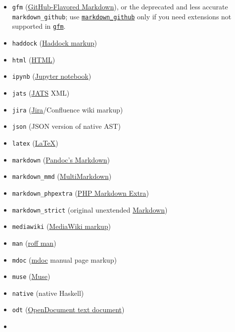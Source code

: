 \documentclass[
]{article}
\begin{document}
\begin{description}
\begin{itemize}
  e-book)
\item
  \texttt{gfm}
  (\href{https://help.github.com/articles/github-flavored-markdown/}{GitHub-Flavored
  Markdown}), or the deprecated and less accurate
  \texttt{markdown\_github}; use
  \protect\hyperlink{markdown-variants}{\texttt{markdown\_github}} only
  if you need extensions not supported in
  \protect\hyperlink{markdown-variants}{\texttt{gfm}}.
\item
  \texttt{haddock}
  (\href{https://www.haskell.org/haddock/doc/html/ch03s08.html}{Haddock
  markup})
\item
  \texttt{html} (\href{https://www.w3.org/html/}{HTML})
\item
  \texttt{ipynb}
  (\href{https://nbformat.readthedocs.io/en/latest/}{Jupyter notebook})
\item
  \texttt{jats} (\href{https://jats.nlm.nih.gov}{JATS} XML)
\item
  \texttt{jira}
  (\href{https://jira.atlassian.com/secure/WikiRendererHelpAction.jspa?section=all}{Jira}/Confluence
  wiki markup)
\item
  \texttt{json} (JSON version of native AST)
\item
  \texttt{latex} (\href{https://www.latex-project.org/}{LaTeX})
\item
  \texttt{markdown} (\protect\hyperlink{pandocs-markdown}{Pandoc's
  Markdown})
\item
  \texttt{markdown\_mmd}
  (\href{https://fletcherpenney.net/multimarkdown/}{MultiMarkdown})
\item
  \texttt{markdown\_phpextra}
  (\href{https://michelf.ca/projects/php-markdown/extra/}{PHP Markdown
  Extra})
\item
  \texttt{markdown\_strict} (original unextended
  \href{https://daringfireball.net/projects/markdown/}{Markdown})
\item
  \texttt{mediawiki}
  (\href{https://www.mediawiki.org/wiki/Help:Formatting}{MediaWiki
  markup})
\item
  \texttt{man} (\href{https://man.cx/groff_man(7)}{roff man})
\item
  \texttt{mdoc} (\href{https://mandoc.bsd.lv/man/mdoc.7.html}{mdoc}
  manual page markup)
\item
  \texttt{muse} (\href{https://amusewiki.org/library/manual}{Muse})
\item
  \texttt{native} (native Haskell)
\item
  \texttt{odt}
  (\href{https://en.wikipedia.org/wiki/OpenDocument}{OpenDocument text
  document})
\item

\end{itemize}
\end{description}
\end{document}
